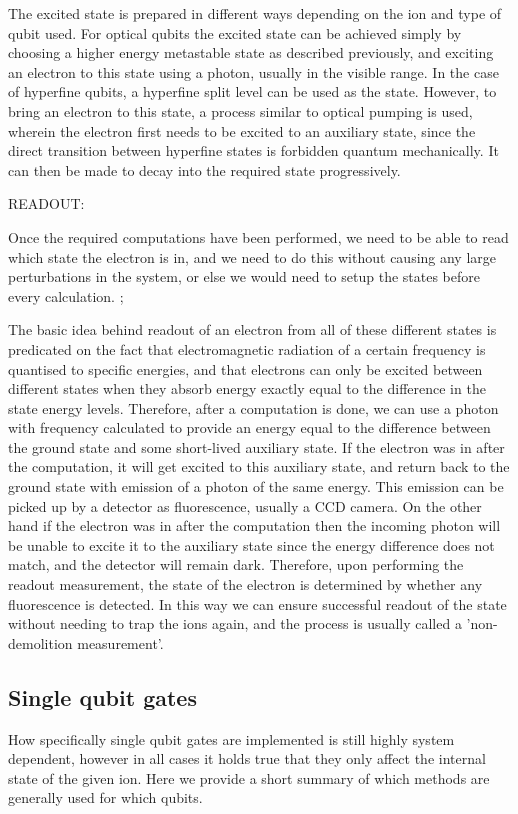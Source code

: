 The excited state \ko is prepared in different ways depending on the ion and type of qubit used. For optical qubits the excited state can be achieved simply by choosing a higher energy metastable state as described previously, and exciting an electron to this state using a photon, usually in the visible range. In the case of hyperfine qubits, a hyperfine split level can be used as the \ko state. However, to bring an electron to this state, a process similar to optical pumping is used, wherein the electron first needs to be excited to an auxiliary state, since the direct transition between hyperfine states is forbidden quantum mechanically. It can then be made to decay into the required \ko state progressively.

READOUT:

Once the required computations have been performed, we need to be able to read which state the electron is in, and we need to do this without causing any large perturbations in the system, or else we would need to setup the states before every calculation. ;

The basic idea behind readout of an electron from all of these different states is predicated on the fact that electromagnetic radiation of a certain frequency is quantised to specific energies, and that electrons can only be excited between different states when they absorb energy exactly equal to the difference in the state energy levels. Therefore, after a computation is done, we can use a photon with frequency calculated to provide an energy equal to the difference between the ground state \kz and some short-lived auxiliary state. If the electron was in \kz after the computation, it will get excited to this auxiliary state, and return back to the ground state with emission of a photon of the same energy. This emission can be picked up by a detector as fluorescence, usually a CCD camera. On the other hand if the electron was in \ko after the computation then the incoming photon will be unable to excite it to the auxiliary state since the energy difference does not match, and the detector will remain dark. Therefore, upon performing the readout measurement, the state of the electron is determined by whether any fluorescence is detected. In this way we can ensure successful readout of the state without needing to trap the ions again, and the process is usually called a 'non-demolition measurement'.

\subsection{Single qubit gates}
How specifically single qubit gates are implemented is still highly system dependent, however in all cases it holds true that they only affect the internal state of the given ion.
Here we provide a short summary of which methods are generally used for which qubits.

